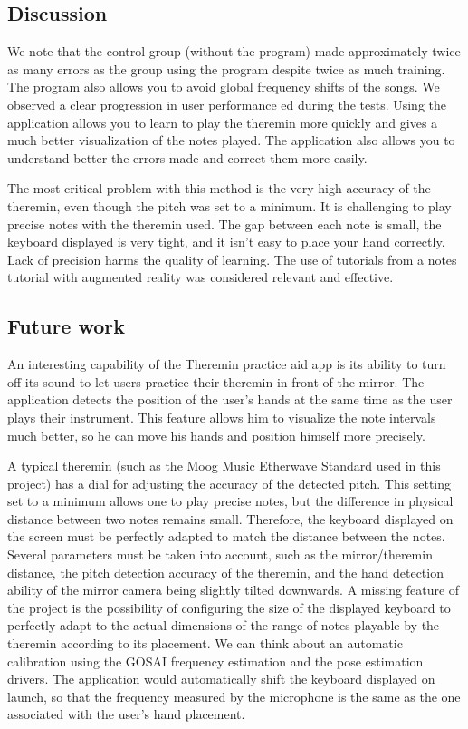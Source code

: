 \subsection{Discussion}
We note that the control group (without the program) made approximately twice as many errors as the group using the program despite twice as much training. The program also allows you to avoid global frequency shifts of the songs. We observed a clear progression in user performance ed during the tests. Using the application allows you to learn to play the theremin more quickly and gives a much better visualization of the notes played. The application also allows you to understand better the errors made and correct them more easily.

The most critical problem with this method is the very high accuracy of the theremin, even though the pitch was set to a minimum. It is challenging to play precise notes with the theremin used. The gap between each note is small, the keyboard displayed is very tight, and it isn't easy to place your hand correctly. Lack of precision harms the quality of learning. The use of tutorials from a notes tutorial with augmented reality was considered relevant and effective.

\subsection{Future work}

An interesting capability of the Theremin practice aid app is its ability to turn off its sound to let users practice their theremin in front of the mirror. The application detects the position of the user's hands at the same time as the user plays their instrument. This feature allows him to visualize the note intervals much better, so he can move his hands and position himself more precisely. 

A typical theremin (such as the Moog Music Etherwave Standard used in this project) has a dial for adjusting the accuracy of the detected pitch. This setting set to a minimum allows one to play precise notes, but the difference in physical distance between two notes remains small. Therefore, the keyboard displayed on the screen must be perfectly adapted to match the distance between the notes. Several parameters must be taken into account, such as the mirror/theremin distance, the pitch detection accuracy of the theremin, and the hand detection ability of the mirror camera being slightly tilted downwards. 
A missing feature of the project is the possibility of configuring the size of the displayed keyboard to perfectly adapt to the actual dimensions of the range of notes playable by the theremin according to its placement. We can think about an automatic calibration using the GOSAI frequency estimation and the pose estimation drivers. The application would automatically shift the keyboard displayed on launch, so that the frequency measured by the microphone is the same as the one associated with the user's hand placement.

